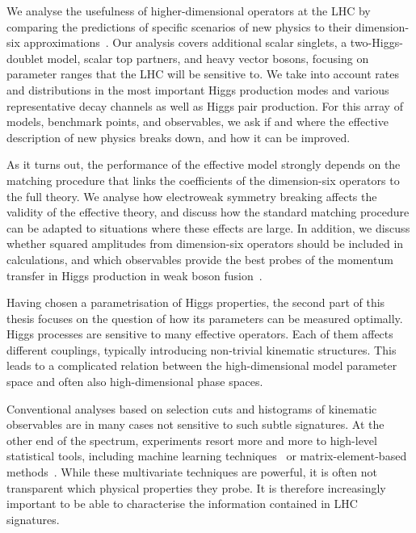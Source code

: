 We analyse the usefulness of higher-dimensional operators at the LHC
by comparing the predictions of specific scenarios of new physics to
their dimension-six approximations~\cite{Brehmer:2015rna}. Our
analysis covers additional scalar singlets, a two-Higgs-doublet model,
scalar top partners, and heavy vector bosons, focusing on parameter
ranges that the LHC will be sensitive to. We take into account rates
and distributions in the most important Higgs production modes and
various representative decay channels as well as Higgs pair
production. For this array of models, benchmark points, and
observables, we ask if and where the effective description of new
physics breaks down, and how it can be improved.

As it turns out, the performance of the effective model strongly
depends on the matching procedure that links the coefficients of the
dimension-six operators to the full theory. We analyse how electroweak
symmetry breaking affects the validity of the effective theory, and
discuss how the standard matching procedure can be adapted to
situations where these effects are large. In addition, we discuss
whether squared amplitudes from dimension-six operators should be
included in calculations, and which observables provide the best
probes of the momentum transfer in Higgs production in weak boson
fusion~\cite{Biekotter:2016ecg}.

\newparagraph
%
Having chosen a parametrisation of Higgs properties, the second part
of this thesis focuses on the question of how its parameters can be
measured optimally. Higgs processes are sensitive to many effective
operators. Each of them affects different couplings, typically
introducing non-trivial kinematic structures. This leads to a
complicated relation between the high-dimensional model parameter
space and often also high-dimensional phase spaces.

Conventional analyses based on selection cuts and histograms of
kinematic observables are in many cases not sensitive to such subtle
signatures.  At the other end of the spectrum, experiments resort more
and more to high-level statistical tools, including machine learning
techniques~\cite{Cranmer:2015bka, Louppe:2016ylz, Louppe:2016aov,
  Cranmer:2016lzt, Baldi:2016fzo, Brehmer:ghost_probability,
  Cogan:2014oua, Baldi:2014pta, deOliveira:2015xxd, Almeida:2015jua,
  Baldi:2016fql, Guest:2016iqz, Komiske:2016rsd, Kasieczka:2017nvn,
  Louppe:2017ipp, Baldi:2014kfa, Searcy:2015apa, Santos:2016kno,
  Alves:2016htj, Buckley:2011kc, Bornhauser:2013aya, Bechtle:2017vyu}
or matrix-element-based methods~\cite{Kondo:1988yd, Abazov:2004cs,
  Gao:2010qx, Alwall:2010cq, Avery:2012um, Andersen:2012kn,
  Campbell:2013hz, Artoisenet:2013vfa, Martini:2015fsa,
  Gritsan:2016hjl, Soper:2011cr, Soper:2012pb, Soper:2014rya,
  Atwood:1991ka, Davier:1992nw, Diehl:1993br}. While these
multivariate techniques are powerful, it is often not transparent
which physical properties they probe. It is therefore increasingly
important to be able to characterise the information contained in LHC
signatures.

